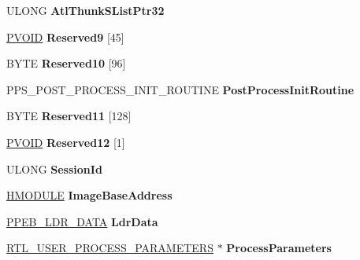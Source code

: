 \begin{DoxyCompactItemize}
U\+L\+O\+NG {\bfseries Atl\+Thunk\+S\+List\+Ptr32}
\item 
\mbox{\label{struct___p_e_b_ad5a52e3cd5fe51e68229c5cdc0fb98b5}} 
\hyperlink{interfacevoid}{P\+V\+O\+ID} {\bfseries Reserved9} \mbox{[}45\mbox{]}
\item 
\mbox{\label{struct___p_e_b_ad663118c630f2762e649f1c957d3474f}} 
B\+Y\+TE {\bfseries Reserved10} \mbox{[}96\mbox{]}
\item 
\mbox{\label{struct___p_e_b_abfdef1da281c1ee5272ec30ff69e7659}} 
P\+P\+S\+\_\+\+P\+O\+S\+T\+\_\+\+P\+R\+O\+C\+E\+S\+S\+\_\+\+I\+N\+I\+T\+\_\+\+R\+O\+U\+T\+I\+NE {\bfseries Post\+Process\+Init\+Routine}
\item 
\mbox{\label{struct___p_e_b_a5b0a7a73146837c14b7423b27544c9ee}} 
B\+Y\+TE {\bfseries Reserved11} \mbox{[}128\mbox{]}
\item 
\mbox{\label{struct___p_e_b_ae6beb1eabe2cc8996c20e2bdc1433f3f}} 
\hyperlink{interfacevoid}{P\+V\+O\+ID} {\bfseries Reserved12} \mbox{[}1\mbox{]}
\item 
\mbox{\label{struct___p_e_b_a72839780d4b76efe8132a010cde3e4a6}} 
U\+L\+O\+NG {\bfseries Session\+Id}
\item 
\mbox{\label{struct___p_e_b_a3b789c81c7a3e524ddb29357069d7c45}} 
\hyperlink{interfacevoid}{H\+M\+O\+D\+U\+LE} {\bfseries Image\+Base\+Address}
\item 
\mbox{\label{struct___p_e_b_a0ecd73ae3fe615cc90172b3e2bd0e9a2}} 
\hyperlink{struct___p_e_b___l_d_r___d_a_t_a}{P\+P\+E\+B\+\_\+\+L\+D\+R\+\_\+\+D\+A\+TA} {\bfseries Ldr\+Data}
\item 
\mbox{\label{struct___p_e_b_a72424145e5abf99596fe6d9be99b2451}} 
\hyperlink{struct___r_t_l___u_s_e_r___p_r_o_c_e_s_s___p_a_r_a_m_e_t_e_r_s}{R\+T\+L\+\_\+\+U\+S\+E\+R\+\_\+\+P\+R\+O\+C\+E\+S\+S\+\_\+\+P\+A\+R\+A\+M\+E\+T\+E\+RS} $\ast$ {\bfseries Process\+Parameters}
\item 
\mbox{\label{struct___p_e_b_a6c354401cb149877b77f30d5e2be52a0}} 

\end{DoxyCompactItemize}
